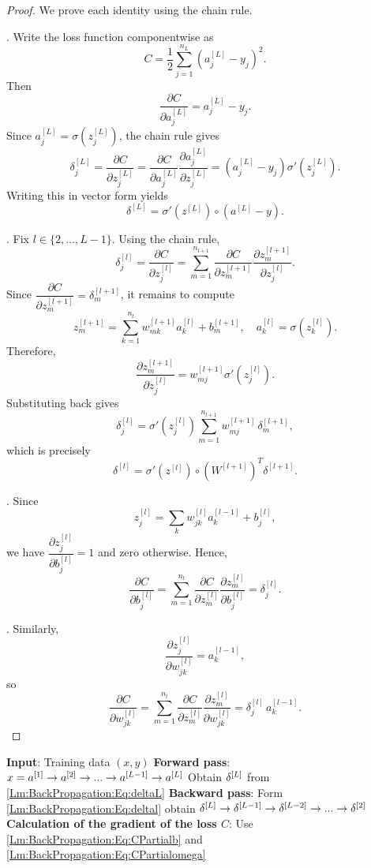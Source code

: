 \begin{proof}
We prove each identity using the chain rule.

.
Write the loss function componentwise as
\[
C = \frac{1}{2}\sum_{j=1}^{n_L} (a^{[L]}_j - y_j)^2.
\]
Then
\[
\frac{\partial C}{\partial a^{[L]}_j} = a^{[L]}_j - y_j.
\]
Since $a^{[L]}_j = \sigma(z^{[L]}_j)$, the chain rule gives
\[
\delta^{[L]}_j = \frac{\partial C}{\partial z^{[L]}_j}
= \frac{\partial C}{\partial a^{[L]}_j}
\frac{\partial a^{[L]}_j}{\partial z^{[L]}_j}
= (a^{[L]}_j - y_j)\sigma'(z^{[L]}_j).
\]
Writing this in vector form yields
\[
\delta^{[L]} = \sigma'(z^{[L]}) \circ (a^{[L]} - y).
\]

.
Fix $l \in \{2,\dots,L-1\}$. Using the chain rule,
\[
\delta^{[l]}_j
= \frac{\partial C}{\partial z^{[l]}_j}
= \sum_{m=1}^{n_{l+1}}
\frac{\partial C}{\partial z^{[l+1]}_m}
\frac{\partial z^{[l+1]}_m}{\partial z^{[l]}_j}.
\]
Since $\dfrac{\partial C}{\partial z^{[l+1]}_m} = \delta^{[l+1]}_m$, it remains to compute
\[
z^{[l+1]}_m = \sum_{k=1}^{n_l} w^{[l+1]}_{mk} a^{[l]}_k + b^{[l+1]}_m,
\quad a^{[l]}_k = \sigma(z^{[l]}_k).
\]
Therefore,
\[
\frac{\partial z^{[l+1]}_m}{\partial z^{[l]}_j}
= w^{[l+1]}_{mj} \sigma'(z^{[l]}_j).
\]
Substituting back gives
\[
\delta^{[l]}_j
= \sigma'(z^{[l]}_j)
\sum_{m=1}^{n_{l+1}} w^{[l+1]}_{mj}\,\delta^{[l+1]}_m,
\]
which is precisely
\[
\delta^{[l]} = \sigma'(z^{[l]}) \circ (W^{[l+1]})^T \delta^{[l+1]}.
\]

.
Since
\[
z^{[l]}_j = \sum_k w^{[l]}_{jk} a^{[l-1]}_k + b^{[l]}_j,
\]
we have $\dfrac{\partial z^{[l]}_j}{\partial b^{[l]}_j} = 1$ and zero otherwise.
Hence,
\[
\frac{\partial C}{\partial b^{[l]}_j}
= \sum_{m=1}^{n_l}
\frac{\partial C}{\partial z^{[l]}_m}
\frac{\partial z^{[l]}_m}{\partial b^{[l]}_j}
= \delta^{[l]}_j.
\]

.
Similarly,
\[
\frac{\partial z^{[l]}_j}{\partial w^{[l]}_{jk}} = a^{[l-1]}_k,
\]
so
\[
\frac{\partial C}{\partial w^{[l]}_{jk}}
= \sum_{m=1}^{n_l}
\frac{\partial C}{\partial z^{[l]}_m}
\frac{\partial z^{[l]}_m}{\partial w^{[l]}_{jk}}
= \delta^{[l]}_j\, a^{[l-1]}_k.
\]
\end{proof}

\begin{algorithm}[H]
\caption{Gradient Descent on Neural Networks: Backpropagation}
\label{Alg:BackPropagation}
\begin{algorithmic}[1]
\STATE \textbf{Input}: Training data $(x,y)$
\STATE \textbf{Forward pass}: $x= a^{[1]}\rightarrow a^{[2]}\rightarrow...\rightarrow a^{[L-1]} \rightarrow a^{[L]}$
\STATE Obtain $\delta^{[L]}$ from \eqref{Lm:BackPropagation:Eq:deltaL}
\STATE \textbf{Backward pass}: Form \eqref{Lm:BackPropagation:Eq:deltal} obtain $\delta^{[L]}\rightarrow \delta^{[L-1]}\rightarrow \delta^{[L-2]}\rightarrow ... \rightarrow \delta^{[2]}$
\STATE \textbf{Calculation of the gradient of the loss $C$}: Use \eqref{Lm:BackPropagation:Eq:CPartialb} and \eqref{Lm:BackPropagation:Eq:CPartialomega}
\end{algorithmic}
\end{algorithm}


